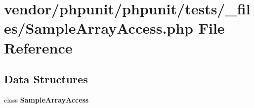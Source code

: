 \section{vendor/phpunit/phpunit/tests/\+\_\+files/\+Sample\+Array\+Access.php File Reference}
\label{_sample_array_access_8php}
\subsection*{Data Structures}
\begin{DoxyCompactItemize}
\item 
class {\bf Sample\+Array\+Access}
\end{DoxyCompactItemize}
